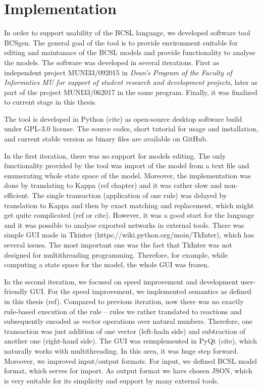\documentclass[12pt]{fithesis2}
\begin{document}
\chapter{Implementation}

In order to support usability of the BCSL language, we developed software tool BCSgen. The general goal of the tool is to provide environment suitable for editing and maintanace of the BCSL models and provide functionality to analyse the models. The software was developed in several iterations. First as independent project MUNI33/092015 in \emph{Dean's Program of the Faculty of Informatics MU for support of student research and development projects}, later as part of the project MUNI33/062017 in the same program. Finally, it was finalized to current stage in this thesis.

The tool is developed in Python (cite) as open-source desktop software build under GPL-3.0 license. The source codes, short tutorial for usage and installation, and current stable version as binary files are available on GitHub\footnotemark[1].

In the first iteration, there was no support for models editing. The only functionality provided by the tool was import of the model from a text file and enumerating whole state space of the model. Moreover, the implementation was done by translating to Kappa (ref chapter) and it was rather slow and non-efficient. The single transaction (application of one rule) was delayed by translation to Kappa and then by exact matching and replacement, which might get quite complicated (ref or cite). However, it was a good start for the language and it was possible to analyse exported networks in external tools. There was simple GUI made in Tkinter (https://wiki.python.org/moin/TkInter), which has several issues. The most important one was the fact that TkInter was not designed for multithreading programming. Therefore, for example, while computing a state space for the model, the whole GUI was frozen.

In the second iteration, we focused on speed improvement and development user-friendly GUI. For the speed improvement, we implemented semantics as defined in this thesis (ref). Compared to previous iteration, now there was no exactly rule-based execution of the rule -- rules we rather translated to reactions and subsequently encoded as vector operations over natural numbers. Therefore, one transaction was just addition of one vector (left-hadn side) and subtraction of another one (right-hand side). The GUI was reimplemented in PyQt (cite), which naturally works with multithreading. In this area, it was huge step forward. Moreover, we improved input/output formats. For input, we defined BCSL model format, which serves for import. As output format we have chosen JSON, which is very suitable for its simplicity and support by many external tools.
\end{document}
